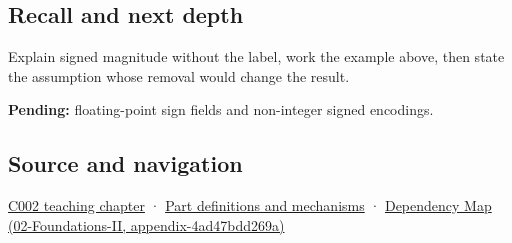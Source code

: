 \subsection{Recall and next depth}\label{appendix-ce20506c8532-recall-and-next-depth}

Explain signed magnitude without the label, work the example above, then state the assumption whose removal would change the result.

\textbf{Pending:} floating-point sign fields and non-integer signed encodings.

\subsection{Source and navigation}\label{appendix-ce20506c8532-source-and-navigation}

\hyperref[01-foundations-i-ch001-arithmetic-becomes-a-policy]{C002 teaching chapter} · \hyperref[appendix-fd090d982a15]{Part definitions and mechanisms} · \href{../02-Foundations-II/main.pdf\#nameddest=appendix-4ad47bdd269a}{Dependency Map (02-Foundations-II, appendix-4ad47bdd269a)}
